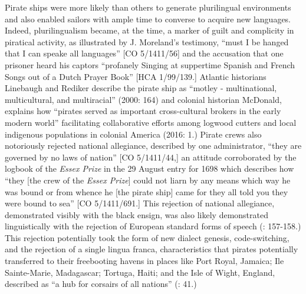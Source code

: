 Pirate ships were more likely than others to generate plurilingual environments and also enabled sailors with ample time to converse to acquire new languages. Indeed, plurilingualism became, at the time, a marker of guilt and complicity in piratical activity, as illustrated by J. Moreland’s testimony, “must I be hanged that I can speake all languages” [CO 5/1411/56] and the accusation that one prisoner heard his captors “profanely Singing at suppertime Spanish and French Songs out of a Dutch Prayer Book” [HCA 1/99/139.] Atlantic historians Linebaugh and Rediker describe the pirate ship as “motley - multinational, multicultural, and multiracial” (2000: 164) and colonial historian McDonald, explains how “pirates served as important cross-cultural brokers in the early modern world” facilitating collaborative efforts among logwood cutters and local indigenous populations in colonial America (2016: 1.)  Pirate crews also notoriously rejected national allegiance, described by one administrator, “they are governed by no laws of nation” [CO 5/1411/44,] an attitude corroborated by the logbook of the \textit{Essex Prize} in the 29 August entry for 1698 which describes how “they [the crew of the \textit{Essex Prize}] could not liarn by any means which way he was bound or from whence he [the pirate ship] came for they all told you they were bound to sea” [CO 5/1411/691.] This rejection of national allegiance, demonstrated visibly with the black ensign, was also likely demonstrated linguistically with the rejection of European standard forms of speech (\citealt{Delgado2013}: 157-158.) This rejection potentially took the form of new dialect genesis, code-switching, and the rejection of a single lingua franca, characteristics that pirates potentially transferred to their freebooting havens in places like Port Royal, Jamaica; Ile Sainte-Marie, Madagascar; Tortuga, Haiti; and the Isle of Wight, England, described as “a hub for corsairs of all nations” (\citealt{Bicheno2012}: 41.) 

